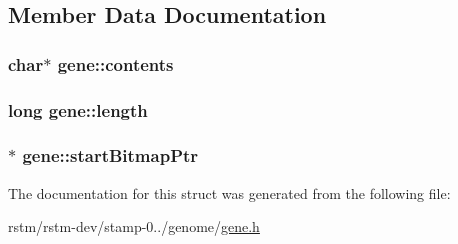\subsection{Member Data Documentation}
\hypertarget{structgene_a26fc54cc0fb18bd13a224954752b5a64}{
\subsubsection[{contents}]{\setlength{\rightskip}{0pt plus 5cm}char$\ast$ gene\-::contents}}\label{structgene_a26fc54cc0fb18bd13a224954752b5a64}
\hypertarget{structgene_aeacdab4421294968ba252d081bf3a664}{
\subsubsection[{length}]{\setlength{\rightskip}{0pt plus 5cm}long gene\-::length}}\label{structgene_aeacdab4421294968ba252d081bf3a664}
\hypertarget{structgene_a2bccf5433760bcb411a5b223457115ce}{
\subsubsection[{start\-Bitmap\-Ptr}]{$\ast$ gene\-::start\-Bitmap\-Ptr}}\label{structgene_a2bccf5433760bcb411a5b223457115ce}


The documentation for this struct was generated from the following file\-:\begin{DoxyCompactItemize}
\item 
rstm/rstm-\/dev/stamp-\/0../genome/\hyperlink{gene_8h}{gene.\-h}\end{DoxyCompactItemize}
